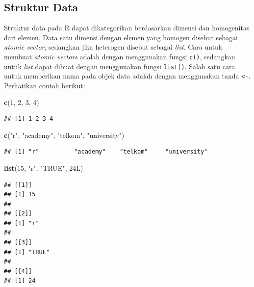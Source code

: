 \documentclass[]{article}
\newenvironment{Shaded}{\begin{snugshade}}{\end{snugshade}}
\newcommand{\KeywordTok}[1]{\textcolor[rgb]{0.13,0.29,0.53}{\textbf{#1}}}
\newcommand{\DecValTok}[1]{\textcolor[rgb]{0.00,0.00,0.81}{#1}}
\newcommand{\StringTok}[1]{\textcolor[rgb]{0.31,0.60,0.02}{#1}}
\newcommand{\NormalTok}[1]{#1}
\begin{document}
\subsection{Struktur Data}\label{struktur-data}

Struktur data pada R dapat dikategorikan berdasarkan dimensi dan
homogenitas dari elemen. Data satu dimensi dengan elemen yang homogen
disebut sebagai \emph{atomic vector}, sedangkan jika heterogen disebut
sebagai \emph{list}. Cara untuk membuat \emph{atomic vectors} adalah
dengan menggunakan fungsi \texttt{c()}, sedangkan untuk \emph{list}
dapat dibuat dengan menggunakan fungsi \texttt{list()}. Salah satu cara
untuk memberikan nama pada objek data adalah dengan menggunakan tanda
\texttt{\textless{}-}. Perhatikan contoh berikut:

\begin{Shaded}
\begin{Highlighting}[]
\KeywordTok{c}\NormalTok{(}\DecValTok{1}\NormalTok{, }\DecValTok{2}\NormalTok{, }\DecValTok{3}\NormalTok{, }\DecValTok{4}\NormalTok{)}
\end{Highlighting}
\end{Shaded}

\begin{verbatim}
## [1] 1 2 3 4
\end{verbatim}

\begin{Shaded}
\begin{Highlighting}[]
\KeywordTok{c}\NormalTok{(}\StringTok{"r"}\NormalTok{, }\StringTok{"academy"}\NormalTok{, }\StringTok{"telkom"}\NormalTok{, }\StringTok{"university"}\NormalTok{)}
\end{Highlighting}
\end{Shaded}

\begin{verbatim}
## [1] "r"          "academy"    "telkom"     "university"
\end{verbatim}

\begin{Shaded}
\begin{Highlighting}[]
\KeywordTok{list}\NormalTok{(}\DecValTok{15}\NormalTok{, }\StringTok{"r"}\NormalTok{, }\StringTok{"TRUE"}\NormalTok{, 24L)}
\end{Highlighting}
\end{Shaded}

\begin{verbatim}
## [[1]]
## [1] 15
## 
## [[2]]
## [1] "r"
## 
## [[3]]
## [1] "TRUE"
## 
## [[4]]
## [1] 24
\end{verbatim}
\end{document}
